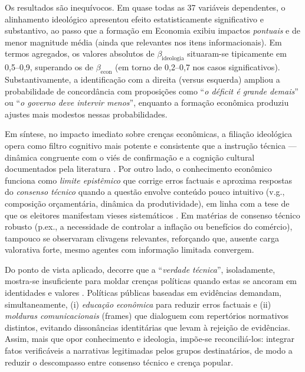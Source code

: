 Os resultados são inequívocos. Em quase todas as 37 variáveis dependentes, o alinhamento ideológico apresentou efeito estatisticamente significativo e substantivo, ao passo que a formação em Economia exibiu impactos \textit{pontuais} e de menor magnitude média (ainda que relevantes nos itens informacionais). Em termos agregados, os valores absolutos de $\beta_{\text{ideologia}}$ situaram-se tipicamente em 0{,}5--0{,}9, superando os de $\beta_{\text{econ}}$ (em torno de 0{,}2--0{,}7 nos casos significativos). Substantivamente, a identificação com a direita (versus esquerda) ampliou a probabilidade de concordância com proposições como ``\textit{o déficit é grande demais}'' ou ``\textit{o governo deve intervir menos}'', enquanto a formação econômica produziu ajustes mais modestos nessas probabilidades.

Em síntese, no impacto imediato sobre crenças econômicas, a filiação ideológica opera como filtro cognitivo mais potente e consistente que a instrução técnica --- dinâmica congruente com o viés de confirmação e a cognição cultural documentados pela literatura \cite{kahneman2011thinking, kahan2012polarization}. Por outro lado, o conhecimento econômico funciona como \textit{limite epistêmico} que corrige erros factuais e aproxima respostas do \textit{consenso técnico} quando a questão envolve conteúdo pouco intuitivo (v.g., composição orçamentária, dinâmica da produtividade), em linha com a tese de que os eleitores manifestam vieses sistemáticos \cite{The_Myth_of_the_Rational_Voter}. Em matérias de consenso técnico robusto (p.ex., a necessidade de controlar a inflação ou benefícios do comércio), tampouco se observaram clivagens relevantes, reforçando que, ausente carga valorativa forte, mesmo agentes com informação limitada convergem.

Do ponto de vista aplicado, decorre que a ``\textit{verdade técnica}'', isoladamente, mostra-se insuficiente para moldar crenças políticas quando estas se ancoram em identidades e valores \cite{westen2007political}. Políticas públicas baseadas em evidências demandam, simultaneamente, (i) \textit{educação econômica} para reduzir erros factuais e (ii) \textit{molduras comunicacionais} (frames) que dialoguem com repertórios normativos distintos, evitando dissonâncias identitárias que levam à rejeição de evidências. Assim, mais que opor conhecimento e ideologia, impõe-se reconciliá-los: integrar fatos verificáveis a narrativas legitimadas pelos grupos destinatários, de modo a reduzir o descompasso entre consenso técnico e crença popular.

